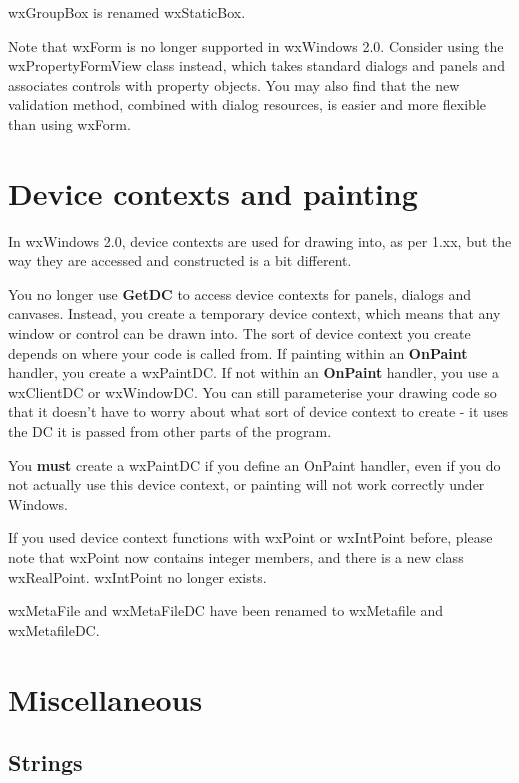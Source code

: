 
wxGroupBox is renamed wxStaticBox.


Note that wxForm is no longer supported in wxWindows 2.0. Consider using the wxPropertyFormView class
instead, which takes standard dialogs and panels and associates controls with property objects.
You may also find that the new validation method, combined with dialog resources, is easier
and more flexible than using wxForm.

\chapter{Device contexts and painting}\label{dc}

In wxWindows 2.0, device contexts are used for drawing into, as per 1.xx, but the way
they are accessed and constructed is a bit different.

You no longer use {\bf GetDC} to access device contexts for panels, dialogs and canvases.
Instead, you create a temporary device context, which means that any window or control can be drawn
into. The sort of device context you create depends on where your code is called from. If
painting within an {\bf OnPaint} handler, you create a wxPaintDC. If not within an {\bf OnPaint} handler,
you use a wxClientDC or wxWindowDC. You can still parameterise your drawing code so that it
doesn't have to worry about what sort of device context to create - it uses the DC it is passed
from other parts of the program.

You {\bf must } create a wxPaintDC if you define an OnPaint handler, even if you do not
actually use this device context, or painting will not work correctly under Windows.

If you used device context functions with wxPoint or wxIntPoint before, please note
that wxPoint now contains integer members, and there is a new class wxRealPoint. wxIntPoint
no longer exists.

wxMetaFile and wxMetaFileDC have been renamed to wxMetafile and wxMetafileDC.

\chapter{Miscellaneous}

\section{Strings}

